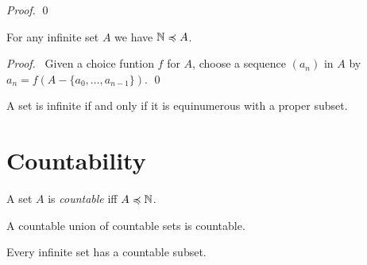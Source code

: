 \begin{proof}
    \pf
    \qed
\end{proof}

\begin{theorem}[AC]
    For any infinite set $A$ we have $\mathbb{N} \preccurlyeq A$.
\end{theorem}

\begin{proof}
    \pf\ Given a choice funtion $f$ for $A$, choose a sequence $(a_n)$ in $A$
    by $a_n = f(A - \{ a_0, \ldots, a_{n-1} \})$. \qed
\end{proof}

\begin{corollary}[AC]
    A set is infinite if and only if it is equinumerous with a proper subset.
\end{corollary}

\section{Countability}

\begin{definition}[Countable]
    A set $A$ is \emph{countable} iff $A \preccurlyeq \mathbb{N}$.
\end{definition}

\begin{theorem}[AC]
    A countable union of countable sets is countable.
\end{theorem}

\begin{proposition}[AC]
    Every infinite set has a countable subset.
\end{proposition}